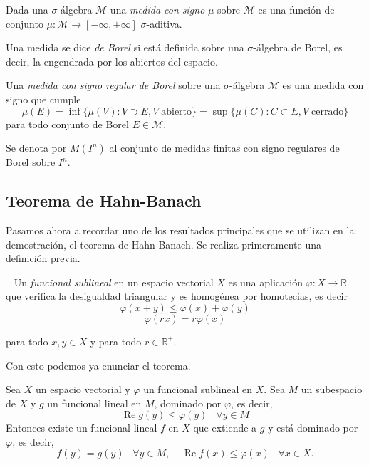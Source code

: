 \begin{definicion}
Dada una $\sigma$-álgebra $\mathcal{M}$ una \textit{medida con signo} $\mu$ sobre $\mathcal{M}$ es una función de conjunto $\mu: \mathcal{M} \rightarrow [-\infty, +\infty]$ $\sigma$-aditiva.
\end{definicion}

\begin{definicion}
Una medida se dice \textit{de Borel} si está definida sobre una $\sigma$-álgebra de Borel, es decir, la engendrada por los abiertos del espacio.
\end{definicion}

\begin{definicion}
Una \textit{medida con signo regular de Borel} sobre una $\sigma$-álgebra $\mathcal{M}$ es una medida con signo que cumple $$ \mu(E) = \inf \{ \mu(V) : V \supset E, V \; \text{abierto} \} = \sup \{ \mu(C) : C \subset E, V \; \text{cerrado} \}$$ para todo conjunto de Borel $E \in \mathcal{M}$.
\end{definicion}

Se denota por $M(I^n)$ al conjunto de medidas finitas con signo regulares de Borel sobre $I^n$.


\subsection{Teorema de Hahn-Banach}

Pasamos ahora a recordar uno de los resultados principales que se utilizan en la demostración, el teorema de Hahn-Banach. Se realiza primeramente una definición previa.

\begin{definicion}~\cite{ash2014real} Un \textit{funcional sublineal} en un espacio vectorial $X$ es una aplicación $\varphi:X \rightarrow \mathbb{R}$ que verifica la desigualdad triangular y es homogénea por homotecias, es decir
$$ \varphi(x+y) \leq \varphi(x) + \varphi(y)$$
$$ \varphi(rx) = r\varphi(x)$$

para todo $x, y \in X$ y para todo $r \in \mathbb{R}^{+}.$
\end{definicion}

Con esto podemos ya enunciar el teorema.

\begin{teorema}\label{thm:hahn-banach} Sea $X$ un espacio vectorial y $\varphi$ un funcional sublineal en $X$. Sea $M$ un subespacio de $X$ y $g$ un funcional lineal en $M$, dominado por $\varphi$, es decir, $$ \operatorname{Re}g(y) \leq \varphi(y) \;\;\; \forall y \in M$$
Entonces existe un funcional lineal $f$ en $X$ que extiende a $g$ y está dominado por $\varphi$, es decir,
$$ f(y) = g(y) \;\;\; \forall y \in M, \;\;\;\;\operatorname{Re}f(x) \leq \varphi(x) \;\;\; \forall x \in X.$$
\end{teorema}

